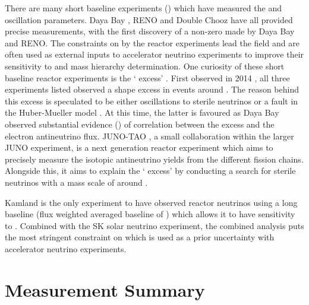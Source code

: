 There are many short baseline experiments () which have measured the \sinsqreac and \delmsqatm oscillation parameters. Daya Bay \cite{PhysRevLett.108.171803}, RENO \cite{PhysRevLett.108.191802} and Double Chooz \cite{PhysRevLett.108.131801} have all provided precise measurements, with the first discovery of a non-zero  made by Daya Bay and RENO. The constraints on \sinsqreac by the reactor experiments lead the field and are often used as external inputs to accelerator neutrino experiments to improve their sensitivity to \dcp and mass hierarchy determination. One curiosity of these short baseline reactor experiments is the ` excess' \cite{Berryman_2019}. First observed in 2014 \cite{For_the_RENO_Collaboration2015-zy, Abe_2014}, all three experiments listed observed a shape excess in events around . The reason behind this excess is speculated to be either oscillations to sterile neutrinos or a fault in the Huber-Mueller model \cite{Mueller_2011}. At this time, the latter is favoured as Daya Bay \cite{PhysRevLett.123.111801} observed substantial evidence (\quickmath{4.0\sigma}) of correlation between the excess and the  electron antineutrino flux.
JUNO-TAO \cite{junocollaboration2020tao}, a small collaboration within the larger JUNO experiment, is a next generation reactor experiment which aims to precisely measure the isotopic antineutrino yields from the different fission chains. Alongside this, it aims to explain the ` excess' by conducting a search for sterile neutrinos with a mass scale of around .

Kamland \cite{Decowski2016-hh} is the only experiment to have observed reactor neutrinos using a long baseline (flux weighted averaged baseline of ) which allows it to have sensitivity to \delmsqsol. Combined with the SK solar neutrino experiment, the combined analysis puts the most stringent constraint on \delmsqsol \cite{PhysRevD.83.052002} which is used as a prior uncertainty with accelerator neutrino experiments.

\section{Measurement Summary}
\label{sec:NeutrinoOscillationPhysics_MeasurementSummary}
